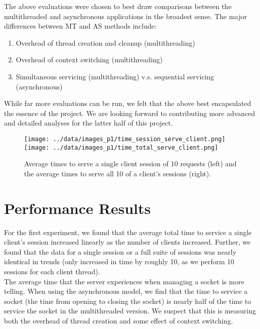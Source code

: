 \documentclass[paper=a4, fontsize=11pt]{scrartcl} %
\numberwithin{equation}{section} %
\numberwithin{figure}{section} %
\numberwithin{table}{section} %
\begin{document}
The above evaluations were chosen to best draw comparisons between the multithreaded and asynchronous applications in the broadest sense. The major differences between MT and AS methods include:

\begin{enumerate}
	\item Overhead of thread creation and cleanup (multithreading)
	\item Overhead of context switching (multithreading)
	\item Simultaneous servicing (multithreading) v.s. sequential servicing (asynchronous)
\end{enumerate}

While far more evaluations can be run, we felt that the above best encapsulated the essence of the project. We are looking forward to contributing more advanced and detailed analyses for the latter half of this project.


\begin{figure}
  \centering
    \texttt{[image: ../data/images\_p1/time\_session\_serve\_client.png]}
    \texttt{[image: ../data/images\_p1/time\_total\_serve\_client.png]}
  \caption{Average times to serve a single client session of 10 requests (left) and the average times to serve all 10 of a client's sessions (right).}
\end{figure}

\section{Performance Results}

For the first experiment, we found that the average total time to service a single client's session increased linearly as the number of clients increased. Further, we found that the data for a single session or a full suite of sessions was nearly identical in trends (only increased in time by roughly 10, as we perform 10 sessions for each client thread).
\\

The average time that the server experiences when managing a socket is more telling. When using the asynchronous model, we find that the time to service a socket (the time from opening to closing the socket) is nearly half of the time to service the socket in the multithreaded version. We suspect that this is measuring both the overhead of thread creation and some effect of context switching.
\\
\end{document}
